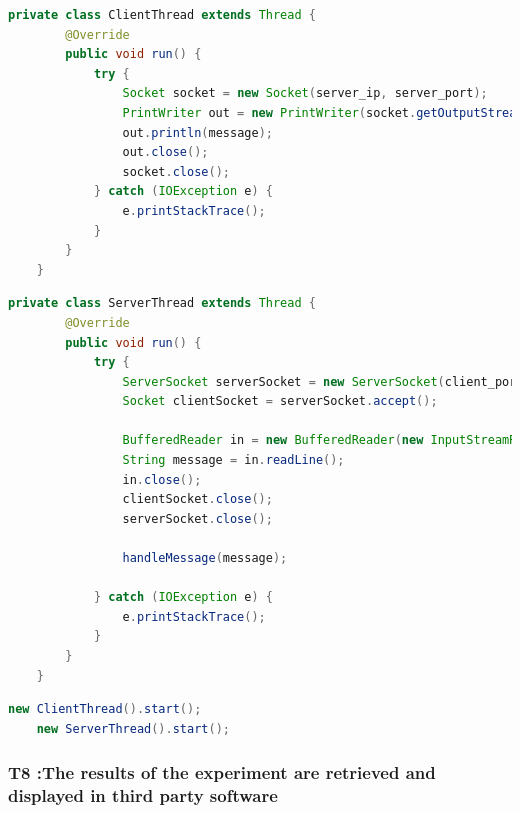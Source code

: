 \vspace{1cm}

\begin{lstlisting}[language=java,label=t7b,lineskip={0pt}, caption=Collect time needed to conduct experiment (b), basicstyle=\scriptsize, captionpos=b]
    private class ClientThread extends Thread {
        @Override
        public void run() {
            try {
                Socket socket = new Socket(server_ip, server_port);
                PrintWriter out = new PrintWriter(socket.getOutputStream(), true);
                out.println(message);
                out.close();
                socket.close();
            } catch (IOException e) {
                e.printStackTrace();
            }
        }
    }
\end{lstlisting}

\begin{lstlisting}[language=java,label=t7a,lineskip={0pt}, caption=Collect time needed to conduct experiment (b), basicstyle=\scriptsize, captionpos=b]
private class ServerThread extends Thread {
        @Override
        public void run() {
            try {
                ServerSocket serverSocket = new ServerSocket(client_port);
                Socket clientSocket = serverSocket.accept();

                BufferedReader in = new BufferedReader(new InputStreamReader(clientSocket.getInputStream()));
                String message = in.readLine();
                in.close();
                clientSocket.close();
                serverSocket.close();

                handleMessage(message);

            } catch (IOException e) {
                e.printStackTrace();
            }
        }
    }
\end{lstlisting}

\begin{lstlisting}[language=java,label=t7c,lineskip={0pt}, caption=Collect time needed to conduct experiment (b), basicstyle=\scriptsize, captionpos=b]
    new ClientThread().start();
    new ServerThread().start();
\end{lstlisting}

\newpage\subsubsection*{T8 :The results of the experiment are retrieved and displayed in third party software}

